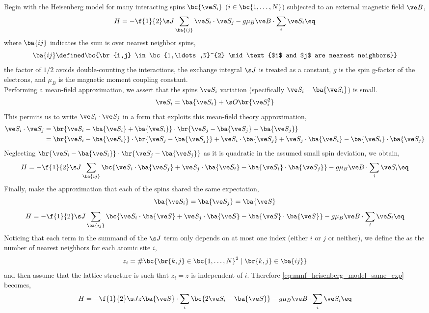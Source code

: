 \documentclass{article}
\begin{document}
Begin with the Heisenberg model for many interacting spins $\bc{\ve S_i}$ ($i \in \bc{1,\ldots,N}$) subjected to an external magnetic field $\ve B$,
\[ H = -\f{1}{2} \s J \sum_{\ba{ij}} {\ve S_i \cdot \ve S_j} - g \mu_{B} \ve B \cdot \sum_{i} \ve S_i \eq \label{eq:heisenberg_model}\]
where $\ba{ij}$ indicates the sum is over nearest neighbor spins,
\[ \ba{ij} \defined \bc{\br{i,j} \in \bc{1,\ldots,N}^{2} \mid \text{$i$ and $j$ are nearest neighbors}} \]
the factor of $1/2$ avoids double-counting the interactions, the exchange integral $\s J$ is treated as a constant, $g$ is the spin g-factor of the electrons, and $\mu_B$ is the magnetic moment coupling constant.\\

Performing a mean-field approximation, we assert that the spins $\ve S_i$ variation (specifically $\ve S_i - \ba{\ve S_i}$) is small.
\[ \ve S_i = \ba{\ve S_i} + \s O \br{\ve S_i^2} \]
This permits us to write $\ve S_i \cdot \ve S_j$ in a form that exploits this mean-field theory approximation,
\begin{align*}
\ve S_i \cdot \ve S_j
&= \br{\ve S_i - \ba{\ve S_i} + \ba{\ve S_i}} \cdot \br{\ve S_j - \ba{\ve S_j} + \ba{\ve S_j}} \\
&= \br{\ve S_i - \ba{\ve S_i}} \cdot \br{\ve S_j - \ba{\ve S_j}} + \ve S_i \cdot \ba{\ve S_j} + \ve S_j \cdot \ba{\ve S_i} - \ba{\ve S_i} \cdot \ba{\ve S_j}
\end{align*}
Neglecting $\br{\ve S_i - \ba{\ve S_i}} \cdot \br{\ve S_j - \ba{\ve S_j}}$ as it is quadratic in the assumed small spin deviation, we obtain,
\[ H = -\f{1}{2} \s J \sum_{\ba{ij}} \bc{\ve S_i \cdot \ba{\ve S_j} + \ve S_j \cdot \ba{\ve S_i} - \ba{\ve S_i} \cdot \ba{\ve S_j}} - g \mu_{B} \ve B \cdot \sum_{i} \ve S_i \eq \label{eq:mmf_heisenberg_model_init}\]
Finally, make the approximation that each of the spins shared the same expectation,
\[ \ba{\ve S_i} = \ba{\ve S_j} = \ba{\ve S} \]
\[ H = -\f{1}{2} \s J \sum_{\ba{ij}} \bc{\ve S_i \cdot \ba{\ve S} + \ve S_j \cdot \ba{\ve S} - \ba{\ve S} \cdot \ba{\ve S}} - g \mu_{B} \ve B \cdot \sum_{i} \ve S_i \eq \label{eq:mmf_heisenberg_model_same_exp}\]
Noticing that each term in the summand of the $\s J$ term only depends on at most one index (either $i$ or $j$ or neither), we define the  as the number of nearest neighbors for each atomic site $i$,
\[ z_i = \# \bc{\br{k, j} \in \bc{1,\ldots,N}^2 \mid \br{k,j} \in \ba{ij}} \]
and then assume that the lattice structure is such that $z_i = z$ is independent of $i$. Therefore \cref{eq:mmf_heisenberg_model_same_exp} becomes,
\[ H = -\f{1}{2} \s J z \ba{\ve S} \cdot \sum_{i} \bc{2\ve S_i - \ba{\ve S}} - g \mu_{B} \ve B \cdot \sum_{i} \ve S_i \eq \label{eq:mmf_heisenberg_model_z_coord} \]
\end{document}
